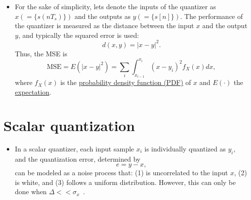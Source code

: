 \begin{itemize}
\item For the sake of simplicity, lets denote the inputs of the
  quantizer as $x (=\{s(nT_s)\})$ and the outputs as $y
  (=\{s[n]\})$. The performance of the quantizer is measured as the
  distance between the input $x$ and the output $y$, and typically the
  squared error is used:
  \begin{equation*}
    d(x,y) = |x-y|^2.
  \end{equation*}
  Thus, the MSE is
  \begin{equation}
    \text{MSE} = E(|x-y|^2)=\sum_i\int_{x_{i-1}}^{x_i} (x-y_i)^2f_X(x)dx,
  \end{equation}
  where $f_X(x)$ is the
  \href{https://en.wikipedia.org/wiki/Probability_density_function}{probability
    density function (PDF)} of $x$ and $E(\cdot)$ the
  \href{https://en.wikipedia.org/wiki/Expected_value}{expectation}.

\end{itemize}

\section{Scalar quantization}
\begin{itemize}
\item In a scalar quantizer, each input sample $x_i$ is individually
  quantized as $y_i$, and the quantization error, determined by
  \begin{equation*}
    e=y-x,
  \end{equation*}
  can be modeled as a noise process that: (1) is uncorrelated to the
  input $x$, (2) is white, and (3) follows a uniform
  distribution. However, this can only be done when
  $\Delta<<\sigma_x$~\cite{vetterli1995wavelets}.

\end{itemize}

